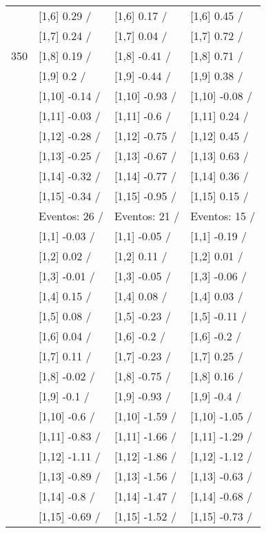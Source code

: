 \begin{table}
\begin{tabular}[t]{llll}
 & {}[1,6] 0.29  / & {}[1,6] 0.17  / & {}[1,6] 0.45  /\\
 & {}[1,7] 0.24  / & {}[1,7] 0.04  / & {}[1,7] 0.72  /\\
350 & {}[1,8] 0.19  / & {}[1,8] -0.41  / & {}[1,8] 0.71  /\\
\addlinespace
 & {}[1,9] 0.2  / & {}[1,9] -0.44  / & {}[1,9] 0.38  /\\
 & {}[1,10] -0.14  / & {}[1,10] -0.93  / & {}[1,10] -0.08  /\\
 & {}[1,11] -0.03  / & {}[1,11] -0.6  / & {}[1,11] 0.24  /\\
 & {}[1,12] -0.28  / & {}[1,12] -0.75  / & {}[1,12] 0.45  /\\
 & {}[1,13] -0.25  / & {}[1,13] -0.67  / & {}[1,13] 0.63  /\\
\addlinespace
 & {}[1,14] -0.32  / & {}[1,14] -0.77  / & {}[1,14] 0.36  /\\
 & {}[1,15] -0.34  / & {}[1,15] -0.95  / & {}[1,15] 0.15  /\\
 & Eventos:  26 / & Eventos:  21 / & Eventos:  15 /\\
 & {}[1,1] -0.03  / & {}[1,1] -0.05  / & {}[1,1] -0.19  /\\
 & {}[1,2] 0.02  / & {}[1,2] 0.11  / & {}[1,2] 0.01  /\\
\addlinespace
 & {}[1,3] -0.01  / & {}[1,3] -0.05  / & {}[1,3] -0.06  /\\
 & {}[1,4] 0.15  / & {}[1,4] 0.08  / & {}[1,4] 0.03  /\\
 & {}[1,5] 0.08  / & {}[1,5] -0.23  / & {}[1,5] -0.11  /\\
 & {}[1,6] 0.04  / & {}[1,6] -0.2  / & {}[1,6] -0.2  /\\
 & {}[1,7] 0.11  / & {}[1,7] -0.23  / & {}[1,7] 0.25  /\\
\addlinespace
500 & {}[1,8] -0.02  / & {}[1,8] -0.75  / & {}[1,8] 0.16  /\\
 & {}[1,9] -0.1  / & {}[1,9] -0.93  / & {}[1,9] -0.4  /\\
 & {}[1,10] -0.6  / & {}[1,10] -1.59  / & {}[1,10] -1.05  /\\
 & {}[1,11] -0.83  / & {}[1,11] -1.66  / & {}[1,11] -1.29  /\\
 & {}[1,12] -1.11  / & {}[1,12] -1.86  / & {}[1,12] -1.12  /\\
\addlinespace
 & {}[1,13] -0.89  / & {}[1,13] -1.56  / & {}[1,13] -0.63  /\\
 & {}[1,14] -0.8  / & {}[1,14] -1.47  / & {}[1,14] -0.68  /\\
 & {}[1,15] -0.69  / & {}[1,15] -1.52  / & {}[1,15] -0.73  /\\
\bottomrule
\end{tabular}
\end{table}
